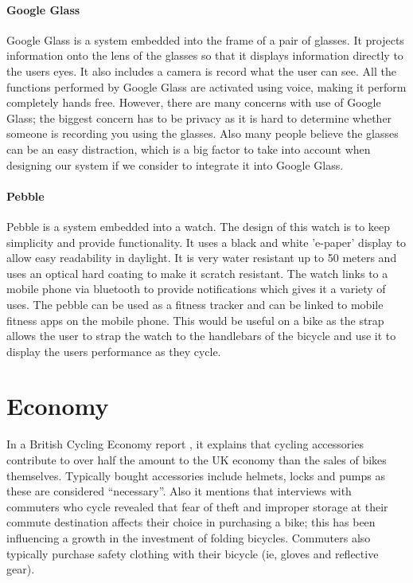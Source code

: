 \documentclass[a4paper]{report}
\begin{document}
{\paragraph{Google Glass}
Google Glass \citep{google_glass} is a system embedded into the frame of a pair of glasses. It projects information onto the lens of the glasses so that it displays information directly to the users eyes. It also includes a camera is record what the user can see. All the functions performed by Google Glass are activated using voice, making it perform completely hands free.
However, there are many concerns with use of Google Glass; the biggest concern has to be privacy \citep{google_glass_privacy} as it is hard to determine whether someone is recording you using the glasses. Also many people believe the glasses can be an easy distraction, which is a big factor to take into account when designing our system if we consider to integrate it into Google Glass.

\paragraph{Pebble}
Pebble \citep{pebble} is a system embedded into a watch. The design of this watch is to keep simplicity and provide functionality. It uses a black and white 'e-paper' display to allow easy readability in daylight. It is very water resistant up to 50 meters and uses an optical hard coating to make it scratch resistant. The watch links to a mobile phone via bluetooth to provide notifications which gives it a variety of uses. The pebble can be used as a fitness tracker and can be linked to mobile fitness apps on the mobile phone. This would be useful on a bike as the strap allows the user to strap the watch to the handlebars of the bicycle and use it to display the users performance as they cycle.

\newpage
\section{Economy}
In a British Cycling Economy report \citep{british_economy_report}, it explains that cycling accessories contribute to over half the amount to the UK economy than the sales of bikes themselves. Typically bought accessories include helmets, locks and pumps as these are considered “necessary”. Also it mentions that interviews with commuters who cycle revealed that fear of theft and improper storage at their commute destination affects their choice in purchasing a bike; this has been influencing a growth in the investment of folding bicycles. Commuters also typically purchase safety clothing with their bicycle (ie, gloves and reflective gear). 

}
\end{document}
